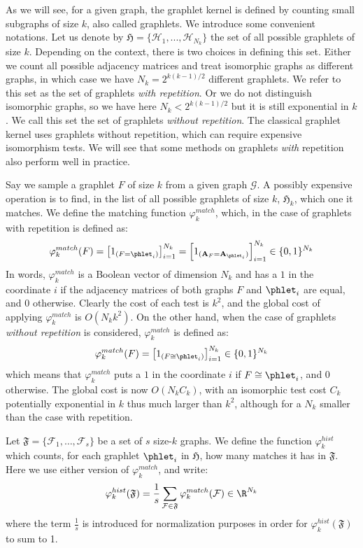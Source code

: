 As we will see, for a given graph, the graphlet kernel is defined by counting small subgraphs of size $k$, also called graphlets. We introduce some convenient notations. Let us denote by $\mathfrak{H}=\{\mathcal{H}_1,..., \mathcal{H}_{N_k}\}$ the set of all possible graphlets of size $k$. Depending on the context, there is two choices in defining this set. Either we count all possible adjacency matrices and treat isomorphic graphs as different graphs, in which case we have $N_k=2^{k(k-1)/2}$ different graphlets. We refer to this set as the set of graphlets \emph{with repetition}. Or we do not distinguish isomorphic graphs, so we have here $N_k<2^{k(k-1)/2}$ but it is still exponential in $k$. We call this set the set of graphlets \emph{without repetition}. The classical graphlet kernel uses graphlets without repetition, which can require expensive isomorphism tests. We will see that some methods on graphlets \emph{with} repetition also perform well in practice.

Say we sample a graphlet $F$  of size $k$ from a given graph $\mathcal{G}$. A possibly expensive operation is to find, in the list of all possible graphlets of size $k$, $\mathfrak{H}_k$, which one it matches. We define the matching function $\varphi_{k}^{match}$, which, in the case of graphlets with repetition is defined as: 
\[
\varphi_k^{match}(F) = \left[ 1_{(F = \phlet_i)}\right]_{i=1}^{N_k}= \left[ 1_{(\mathbf{A}_F = \mathbf{A}_{\phlet_i})}\right]_{i=1}^{N_k} \in \{0,1\}^{N_k}
\]
In words, $\varphi_k^{match}$ is a Boolean vector of dimension $N_k$ and has a $1$ in the coordinate $i$ if the adjacency matrices of both graphs $F$ and $\phlet_i$ are equal, and $0$ otherwise. Clearly the cost of each test is $k^2$, and the global cost of applying $\varphi^{match}_k$ is $O(N_k k^2)$. On the other hand, when the case of graphlets \emph{without repetition} is considered, $\varphi_k^{match}$ is defined as:
\[
\varphi_k^{match}(F) = \left[ 1_{(F \cong \phlet_i)}\right]_{i=1}^{N_k} \in \{0,1\}^{N_k}
\]
which means that $\varphi_k^{match}$ puts a $1$ in the coordinate $i$ if $F\cong \phlet_i$, and $0$ otherwise. The global cost is now $O(N_k C_k)$, with an isomorphic test cost $C_k$ potentially exponential in $k$ thus much larger than $k^2$, although for a $N_k$ smaller than the case with repetition.  

Let $\mathfrak{F}=\{\mathcal{F}_1,\ldots,\mathcal{F}_s\}$ be a set of $s$ size-$k$ graphs. We define the function $\varphi_k^{hist}$ which counts, for each graphlet $\phlet_i$ in $\mathfrak{H}$, how many matches it has in $\mathfrak{F}$. Here we use either version of $\varphi_k^{match}$, and write:
\[
\varphi_k^{hist}(\mathfrak{F})=\frac{1}{s}\sum_{\mathcal{F}\in\mathfrak{F}} \varphi_k^{match} (\mathcal{F}) \in \R^{N_k}
\]
where the term $\frac{1}{s}$ is introduced for normalization purposes in order for  $\varphi_k^{hist}(\mathfrak{F})$ to sum to 1. %


